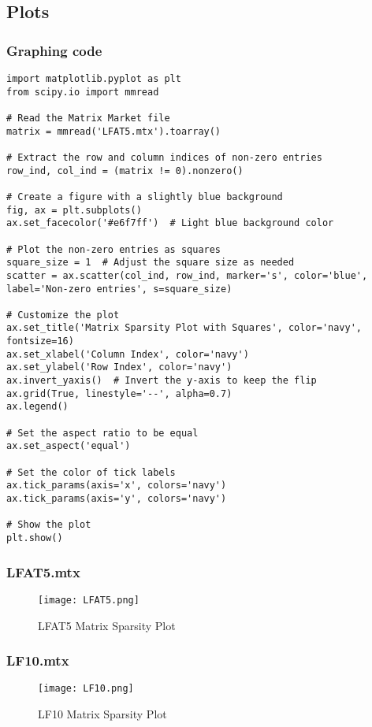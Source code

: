 \documentclass[12pt]{article}
\begin{document}
\subsection{Plots}
\subsubsection{Graphing code}
\begin{lstlisting}
import matplotlib.pyplot as plt
from scipy.io import mmread

# Read the Matrix Market file
matrix = mmread('LFAT5.mtx').toarray()

# Extract the row and column indices of non-zero entries
row_ind, col_ind = (matrix != 0).nonzero()

# Create a figure with a slightly blue background
fig, ax = plt.subplots()
ax.set_facecolor('#e6f7ff')  # Light blue background color

# Plot the non-zero entries as squares
square_size = 1  # Adjust the square size as needed
scatter = ax.scatter(col_ind, row_ind, marker='s', color='blue', label='Non-zero entries', s=square_size)

# Customize the plot
ax.set_title('Matrix Sparsity Plot with Squares', color='navy', fontsize=16)
ax.set_xlabel('Column Index', color='navy')
ax.set_ylabel('Row Index', color='navy')
ax.invert_yaxis()  # Invert the y-axis to keep the flip
ax.grid(True, linestyle='--', alpha=0.7)
ax.legend()

# Set the aspect ratio to be equal
ax.set_aspect('equal')

# Set the color of tick labels
ax.tick_params(axis='x', colors='navy')
ax.tick_params(axis='y', colors='navy')

# Show the plot
plt.show()

\end{lstlisting}


\subsubsection{LFAT5.mtx}
\begin{figure}[h!]
    \centering
    \texttt{[image: LFAT5.png]}
    \caption{LFAT5 Matrix Sparsity Plot}
    \label{fig:LFAT5-matrix}
\end{figure}

\subsubsection{LF10.mtx}
\begin{figure}[h!]
    \centering
    \texttt{[image: LF10.png]}
    \caption{LF10 Matrix Sparsity Plot}
    \label{fig:LF10-matrix}
\end{figure}
\clearpage
\end{document}
